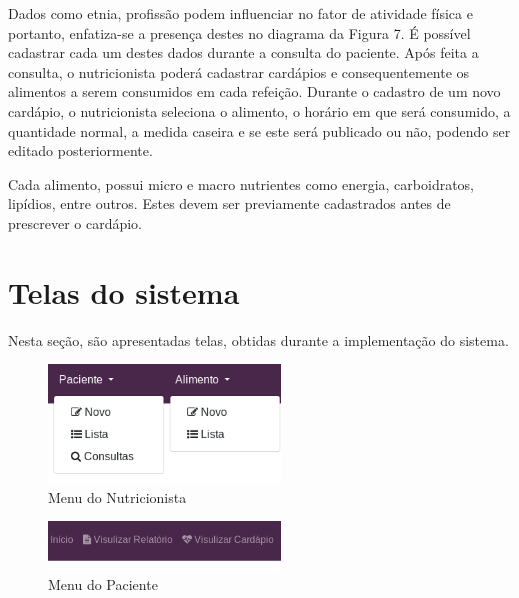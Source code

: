 \documentclass[
	12pt,				%
    oneside,			%
	a4paper,			%
	english,			%
	french,				%
	spanish,			%
	brazil,				%
	]{abntex2}
\begin{document}
Dados como etnia, profissão podem influenciar no fator de atividade física e portanto,
enfatiza-se a presença destes no diagrama da Figura 7. É possível cadastrar cada um destes
dados durante a consulta do paciente. Após feita a consulta, o nutricionista poderá
cadastrar cardápios e consequentemente os alimentos a serem consumidos em cada refeição.
Durante o cadastro de um novo cardápio, o nutricionista seleciona o alimento,
o horário em que será consumido, a quantidade normal, a medida caseira e se este
será publicado ou não, podendo ser editado posteriormente.

Cada alimento, possui micro e macro nutrientes como energia, carboidratos,
lipídios, entre outros. Estes devem ser previamente cadastrados antes de prescrever o
cardápio.

\section{Telas do sistema}

Nesta seção, são apresentadas telas, obtidas durante a implementação do sistema.

\begin{figure} [hbt] 
\begin{center}
\includegraphics[width=0.55\textwidth]{menuNut1.png}
\end{center}
\label{menuNut} 
\caption{Menu do Nutricionista}
\end{figure}

\begin{figure} [hbt] 
\begin{center}
\includegraphics[width=0.55\textwidth]{menuPac1.png}
\end{center}
\label{menuPac} 
\caption{Menu do Paciente}
\end{figure}
\end{document}
